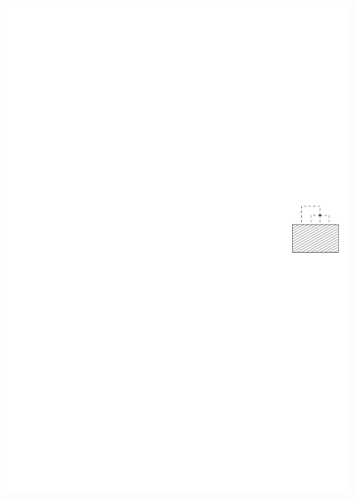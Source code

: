 \documentclass[a4paper]{scrreprt}
\theoremstyle{definition}
\begin{document}
\begin{figure}[h]
        \centering
            {\includegraphics[scale=.8]{oc3_embed/outgoing/outdeg0}}
        \quad

\end{figure}
\end{document}
